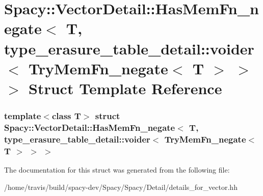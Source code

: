 \hypertarget{structSpacy_1_1VectorDetail_1_1HasMemFn__negate_3_01T_00_01type__erasure__table__detail_1_1voideca47ec2a3524cec61bb86a72afd00836}{\section{\-Spacy\-:\-:\-Vector\-Detail\-:\-:\-Has\-Mem\-Fn\-\_\-negate$<$ \-T, type\-\_\-erasure\-\_\-table\-\_\-detail\-:\-:voider$<$ \-Try\-Mem\-Fn\-\_\-negate$<$ \-T $>$ $>$ $>$ \-Struct \-Template \-Reference}
\label{structSpacy_1_1VectorDetail_1_1HasMemFn__negate_3_01T_00_01type__erasure__table__detail_1_1voideca47ec2a3524cec61bb86a72afd00836}
}
\subsubsection*{template$<$class T$>$ struct Spacy\-::\-Vector\-Detail\-::\-Has\-Mem\-Fn\-\_\-negate$<$ T, type\-\_\-erasure\-\_\-table\-\_\-detail\-::voider$<$ Try\-Mem\-Fn\-\_\-negate$<$ T $>$ $>$ $>$}



\-The documentation for this struct was generated from the following file\-:\begin{DoxyCompactItemize}
\item 
/home/travis/build/spacy-\/dev/\-Spacy/\-Spacy/\-Detail/details\-\_\-for\-\_\-vector.\-hh\end{DoxyCompactItemize}
